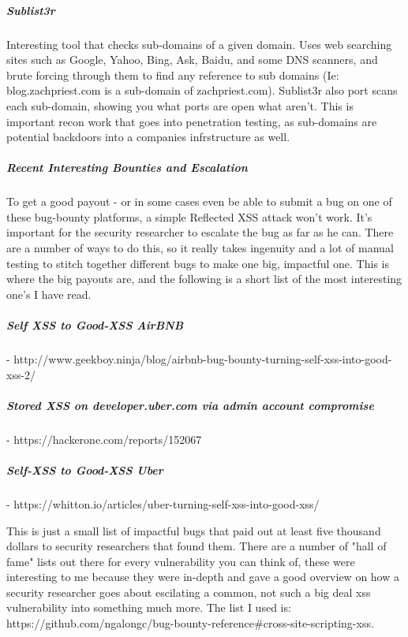 \subparagraph{Sublist3r}
Interesting tool that checks sub-domains of a given domain. Uses web searching sites such as Google, Yahoo, Bing, Ask, Baidu, and some DNS scanners, and brute forcing through them to find any reference to sub domains (Ie: blog.zachpriest.com is a sub-domain of zachpriest.com).
Sublist3r also port scans each sub-domain, showing you what ports are open what aren’t.  This is important recon work that goes into penetration testing, as sub-domains are potential backdoors into a companies infrstructure as well.

\subparagraph{Recent Interesting Bounties and Escalation }
To get a good payout - or in some cases even be able to submit a bug on one of these bug-bounty platforms, a simple Reflected XSS attack won’t work.  It’s important for the security researcher to escalate the bug as far as he can.  There are a number of ways to do this, so it really takes ingenuity and a lot of manual testing to stitch together different bugs to make one big, impactful one.  This is where the big payouts are, and the following is a short list of the most interesting one’s I have read.  

\subparagraph{Self XSS to Good-XSS AirBNB}

- http://www.geekboy.ninja/blog/airbnb-bug-bounty-turning-self-xss-into-good-xss-2/

\subparagraph{Stored XSS on developer.uber.com via admin account compromise} 

- https://hackerone.com/reports/152067

\subparagraph{Self-XSS to Good-XSS Uber}

- https://whitton.io/articles/uber-turning-self-xss-into-good-xss/

This is just a small list of impactful bugs that paid out at least five thousand dollars to security researchers that found them.  There are a number of "hall of fame" lists out there for every vulnerability you can think of, these were interesting to me because they were in-depth and gave a good overview on how a security researcher goes about escilating a common, not such a big deal xss vulnerability into something much more.  The list I used is: https://github.com/ngalongc/bug-bounty-reference\#cross-site-scripting-xss.

